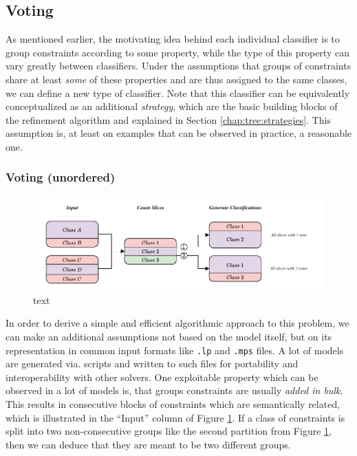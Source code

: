			\clearpage
			
		\subsection{Voting}
		\label{chap:tree:classifiers:voting}
		
			As mentioned earlier, the motivating idea behind each individual classifier is to group constraints according to some property, while the type of this property can vary greatly between classifiers.
			Under the assumptions that groups of constraints share at least \textit{some} of these properties and are thus assigned to the same classes, we can define a new type of classifier.
			Note that this classifier can be equivalently conceptualized as an additional \textit{strategy}, which are the basic building blocks of the refinement algorithm and explained in Section \ref{chap:tree:strategies}.
			This assumption is, at least on examples that can be observed in practice, a reasonable one.
			
			\subsubsection{Voting (unordered)}
			
				\begin{figure}[ht!]
					\centering
					\includegraphics[scale=1.05]{Bilder/DrawIO/strat_ordered_voting_pdf}
					\caption{text}
					\label{fig:tree:classifiers:ovoting}
				\end{figure}
			
				In order to derive a simple and efficient algorithmic approach to this problem, we can make an additional assumptions not based on the model itself, but on its representation in common input formats like \lstinline|.lp| and \lstinline|.mps| files.
				A lot of models are generated via. scripts and written to such files for portability and interoperability with other solvers.
				One exploitable property which can be observed in a lot of models is, that groups constraints are usually \textit{added in bulk}.
				This results in consecutive blocks of constraints which are semantically related, which is illustrated in the \enquote{Input} column of Figure \ref{fig:tree:classifiers:ovoting}.
				If a class of constraints is split into two non-consecutive groups like the second partition from Figure \ref{fig:tree:classifiers:ovoting}, then we can deduce that they are meant to be two different groups.
			
